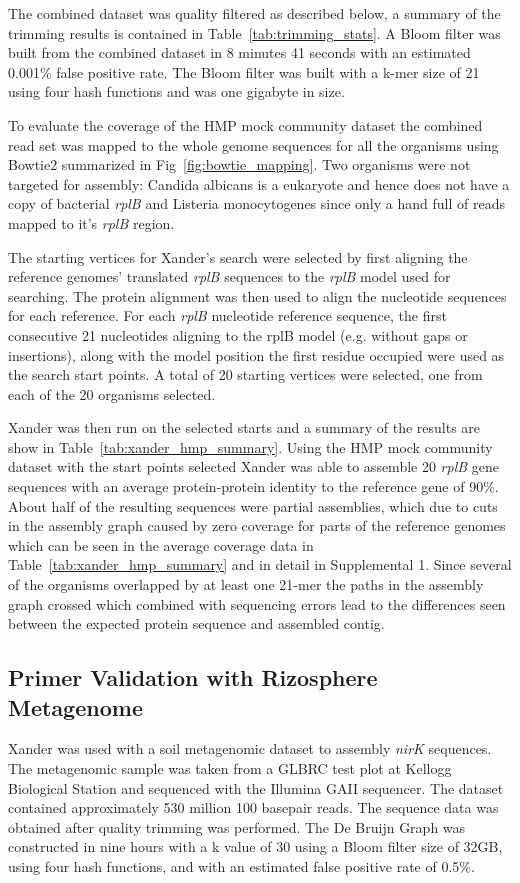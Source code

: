 \documentclass[10pt]{bmc_article}
\newenvironment{bmcformat}{\begin{raggedright}\baselineskip20pt\sloppy\setboolean{publ}{false}}{\end{raggedright}\baselineskip20pt\sloppy}
\begin{document}
\begin{bmcformat}
The combined dataset was quality filtered as described below, a summary of the trimming results is contained in Table~\ref{tab:trimming_stats}.  A Bloom filter was built from the combined dataset in 8 minutes 41 seconds with an estimated 0.001\% false positive rate.  The Bloom filter was built with a k-mer size of 21 using four hash functions and was one gigabyte in size.

To evaluate the coverage of the HMP mock community dataset the combined read set was mapped to the whole genome sequences for all the organisms using Bowtie2\cite{langmead_fast_2012} summarized in Fig~\ref{fig:bowtie_mapping}.  Two organisms were not targeted for assembly: Candida albicans is a eukaryote and hence does not have a copy of bacterial \emph{rplB} and Listeria monocytogenes since only a hand full of reads mapped to it's \emph{rplB} region.

The starting vertices for Xander's search were selected by first aligning the reference genomes' translated \emph{rplB} sequences to the \emph{rplB} model used for searching.  The protein alignment was then used to align the nucleotide sequences for each reference.  For each \emph{rplB} nucleotide reference sequence, the first consecutive 21 nucleotides aligning to the rplB model (e.g. without gaps or insertions), along with the model position the first residue occupied were used as the search start points.  A total of 20 starting vertices were selected, one from each of the 20 organisms selected.

Xander was then run on the selected starts and a summary of the results are show in Table~\ref{tab:xander_hmp_summary}.  Using the HMP mock community dataset with the start points selected Xander was able to assemble 20 \emph{rplB} gene sequences with an average protein-protein identity to the reference gene of 90\%.  About half of the resulting sequences were partial assemblies, which due to cuts in the assembly graph caused by zero coverage for parts of the reference genomes which can be seen in the average coverage data in Table~\ref{tab:xander_hmp_summary} and in detail in Supplemental 1.  Since several of the organisms overlapped by at least one 21-mer the paths in the assembly graph crossed which combined with sequencing errors lead to the differences seen between the expected protein sequence and assembled contig.

\subsection*{Primer Validation with Rizosphere Metagenome}
Xander was used with a soil metagenomic dataset to assembly \emph{nirK} sequences.  The metagenomic sample was taken from a GLBRC test plot at Kellogg Biological Station and sequenced with the Illumina GAII sequencer.  The dataset contained approximately 530 million 100 basepair reads.  The sequence data was obtained after quality trimming was performed. The De Bruijn Graph was constructed in nine hours with a k value of 30 using a Bloom filter size of 32GB, using four hash functions, and with an estimated false positive rate of 0.5\%.


\end{bmcformat}
\end{document}
